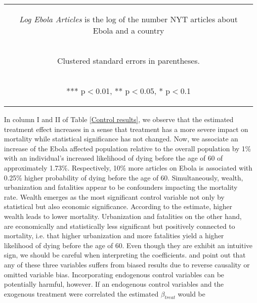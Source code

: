 \documentclass{article}
\begin{document}
\begin{table}[htbp]
{\begin{tabular}{lcccccc}
\multicolumn{7}{c}{\begin{footnotesize} \textit{Log Ebola Articles} is the log of the number NYT articles about Ebola and a country \end{footnotesize} }\\
\multicolumn{7}{c}{\begin{footnotesize} Clustered standard errors in parentheses. \end{footnotesize} }\\
\multicolumn{7}{c}{\begin{footnotesize} *** p$<$0.01, ** p$<$0.05, * p$<$0.1\end{footnotesize}} \\
\end{tabular}
}
\end{table}

In column I and II of Table \ref{Control results}, we observe that the estimated treatment effect increases in a sense that treatment has a more severe impact on mortality while statistical significance has not changed. Now, we associate an increase of the Ebola affected population relative to the overall population by 1\% with an individual's increased likelihood of dying before the age of 60 of approximately 1.73\%. Respectively, 10\% more articles on Ebola is associated with 0.25\% higher probability of dying before the age of 60.
Simultaneously, wealth, urbanization and fatalities appear to be confounders impacting the mortality rate. Wealth emerges as the most significant control variable not only by statistical but also economic significance. According to the estimate, higher wealth leads to lower mortality. Urbanization and fatalities on the other hand, are economically and statistically less significant but positively connected to mortality, i.e. that higher urbanization and more fatalities yield a higher likelihood of dying before the age of 60. Even though they are exhibit an intuitive sign, we should be careful when interpreting the coefficients. \cite{cutler2006determinants} and \cite{gonzalez2017epidemics} point out that any of these three variables suffers from biased results due to reverse causality or omitted variable bias. Incorporating endogenous control variables can be potentially harmful, however. If an endogenous control variables and the exogenous treatment were correlated the estimated $\beta_{treat}$ would be 
\end{document}
